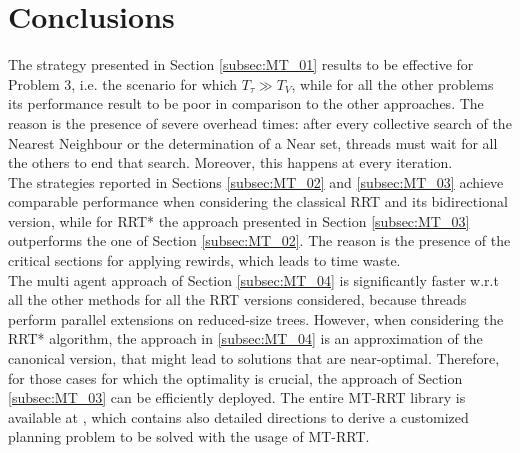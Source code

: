 \documentclass[letterpaper, 10 pt, conference]{ieeeconf}  %
\begin{document}
\section{Conclusions}
\label{sec:conclusion}

The strategy presented in Section \ref{subsec:MT_01} results to be effective for Problem 3, i.e. the scenario for which $T_{\tau}  \gg T_V$, while for all the other problems its performance result to be poor in comparison to the other approaches. The reason is the presence of severe overhead times: after every collective search of the Nearest Neighbour or the determination of a Near set, threads must wait for all the others to end that search. Moreover, this happens at every iteration.
\\
The strategies reported in Sections \ref{subsec:MT_02} and \ref{subsec:MT_03} achieve comparable performance when considering the classical RRT and its bidirectional version, while for RRT* the approach presented in Section \ref{subsec:MT_03} outperforms the one of Section \ref{subsec:MT_02}. The reason is the presence of the critical sections for applying rewirds, which leads to time waste. 
\\
The multi agent approach of Section \ref{subsec:MT_04} is significantly faster w.r.t all the other methods for all the RRT versions considered, because threads perform parallel extensions on reduced-size trees. 
However, when considering the RRT* algorithm, the approach in \ref{subsec:MT_04} is an approximation of the canonical version, that might lead to solutions that are near-optimal. Therefore, for those cases for which the optimality is crucial, the approach of Section \ref{subsec:MT_03} can be efficiently deployed.
The entire MT-RRT library is available at \cite{github_link}, which contains also detailed directions to derive a customized planning problem to be solved with the usage of MT-RRT.





\end{document}
